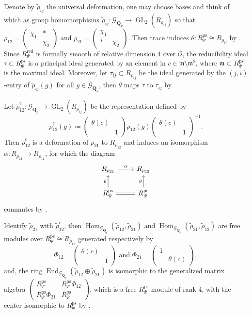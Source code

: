 \documentclass[leqno]{amsart}
\newcommand{\smat}[1]{\left( \begin{smallmatrix} #1 \end{smallmatrix} \right)}
\newcommand{\Gp}{\mathcal{G}_{\Qp}} %
\DeclareMathOperator{\ps}{ps}
\DeclareMathOperator{\red}{red}
\DeclareMathOperator{\GL}{GL}
\newcommand{\Qp}{\mathbf{Q}_p}
\newcommand{\oo}{\mathcal O}
\newcommand{\1}{\mathbf{1}}
\newcommand{\fm}{\mathfrak m}
\DeclareMathOperator{\End}{End}
\DeclareMathOperator{\Hom}{Hom}
\theoremstyle{definition}
\theoremstyle{remark}
\begin{document}
Denote by $\tilde{\rho}_{ij}$ the universal deformation,
one may choose bases and think of which as group homomorphisms
$\tilde{\rho}_{ij}\colon \Gp\to \GL_2(R_{\rho_{ij}})$
so that 
$\rho_{12}=\smat{\chi_1&*\\&\chi_2}$ and
$\rho_{21}=\smat{\chi_1&\\ * &\chi_2}$.
Then trace induces $\theta\colon R_{\Psi}^{\ps}\cong R_{\rho_{ij}}$ by \cite[Prop B.17]{pask}.
Since $R^{\red}_{\Psi}$ is formally smooth of relative dimension $4$ over $\oo$,
the reducibility ideal  $\tau\subset R_{\Psi}^{\ps}$ is a principal ideal generated by 
an element in $c\in\fm\setminus \fm^2$,
where $\fm\subset R_{\Psi}^{\ps}$ is the maximal ideal. 
Moreover, let $\tau_{ij}\subset R_{\rho_{ij}} $ be the ideal 
generated by the $(j,i)$-entry of  $ \tilde{\rho}_{ij}(g)$
for all $g\in \Gp$,
then  $\theta$ maps  $\tau$ to  $\tau_{ij}$ by \cite[Prop B.23]{pask}

Let $\tilde{\rho}_{12}^c\colon \Gp\to \GL_2(R_{\rho_{ij}})$ be the representation defined by
\[
	\tilde{\rho}_{12}^c(g)\coloneqq 
	\smat{\theta(c)&\\&1}
	\tilde{\rho}_{12}(g)
	\smat{\theta(c)&\\&1}^{-1}.
\]
Then $ \tilde{\rho}_{12}^c$ is a deformation of $\rho_{21}$ to $R_{\rho_{12}}$
and induces an isomorphism $\alpha\colon R_{\rho_{21}}\to R_{\rho_{12}}$,
for which the diagram
\[
	\begin{tikzcd}
		R_{\rho_{21}} \arrow[r,"\alpha"] &
		R_{\rho_{12}}\\
		R_{\Psi}^{\ps} \arrow[u,"\theta"] \arrow[r,equal] &
		R_{\Psi}^{\ps} \arrow[u,"\theta"]
	\end{tikzcd}
\]
commutes by \cite[Prop B.24]{pask}.

Identify $\tilde{\rho}_{21}$ with $\tilde{\rho}_{12}^c$,
then
$\Hom_{\Gp}(\tilde{\rho}_{12}, \tilde{\rho}_{21})$ and
$\Hom_{\Gp}(\tilde{\rho}_{21}, \tilde{\rho}_{12})$
are free modules over $R_{\Psi}^{\ps}\cong R_{\rho_{12}}$ 
generated respectively by
\begin{equation}
	\Phi_{12}=\smat{\theta(c)&\\&1} \text{ and }
	\Phi_{21}=\smat{1&\\&\theta(c)},
\end{equation}
and, the ring $\End_{\Gp}(\tilde{\rho}_{12}\oplus \tilde{\rho}_{21})$
is isomorphic to the generalized matrix algebra
$\smat{R_{\Psi}^{\ps}& R_{\Psi}^{\ps}\Phi_{12}\\ R_{\Psi}^{\ps}\Phi_{21}& R_{\Psi}^{\ps}}$,
which is a free $R_{\Psi}^{\ps}$-module of rank  $4$,
with the center isomorphic to  $R_{\Psi}^{\ps}$
by \cite[Prop B.26]{pask}.
\end{document}
